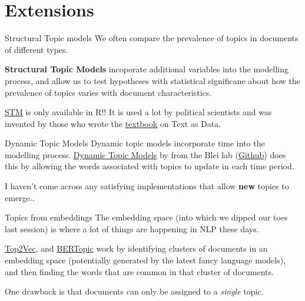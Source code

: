 \documentclass[
  10pt,
  ignorenonframetext,
  aspectratio=169]{beamer}
\begin{document}
\hypertarget{extensions}{%
\section{Extensions}\label{extensions}}

\begin{frame}{Structural Topic models}
\protect\hypertarget{structural-topic-models}{}
We often compare the prevalence of topics in documents of different
types.

\textbf{Structural Topic Models} incoporate additional variables into
the modelling process, and allow us to test hypotheses with statistical
significane about how the prevalence of topics varies with document
characteristics.

\href{https://www.structuraltopicmodel.com/}{STM} is only available in
R!! It is used a lot by political scientists and was invented by those
who wrote the
\href{https://press.princeton.edu/books/hardcover/9780691207544/text-as-data}{textbook}
on Text as Data.
\end{frame}

\begin{frame}{Dynamic Topic Models}
\protect\hypertarget{dynamic-topic-models}{}
Dynamic topic models incorporate time into the modelling process.
\href{https://mimno.infosci.cornell.edu/info6150/readings/dynamic_topic_models.pdf}{Dynamic
Topic Models} by from the Blei lab
(\href{https://github.com/blei-lab/dtm}{Github}) does this by allowing
the words associated with topics to update in each time period.

I haven't come across any satisfying implementations that allow
\textbf{new} topics to emerge..
\end{frame}

\begin{frame}{Topics from embeddings}
\protect\hypertarget{topics-from-embeddings}{}
The embedding space (into which we dipped our toes last session) is
where a lot of things are happening in NLP these days.

\href{https://github.com/ddangelov/Top2Vec}{Top2Vec}, and
\href{https://maartengr.github.io/BERTopic/index.html}{BERTopic} work by
identifying clusters of documents in an embedding space (potentially
generated by the latest fancy language models), and then finding the
words that are common in that cluster of documents.

One drawback is that documents can only be assigned to a \emph{single}
topic.
\end{frame}
\end{document}
